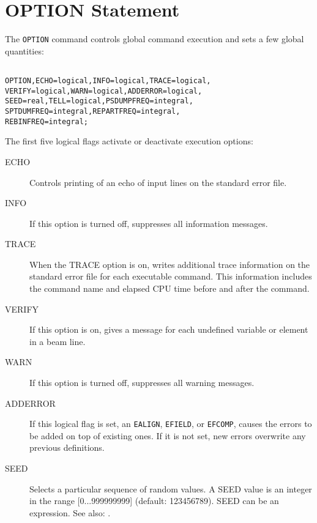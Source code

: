 \section{OPTION Statement}
\label{sec:option}
The \texttt{OPTION} command controls global command execution and sets
a few global quantities:
\begin{verbatim}

OPTION,ECHO=logical,INFO=logical,TRACE=logical,
VERIFY=logical,WARN=logical,ADDERROR=logical,
SEED=real,TELL=logical,PSDUMPFREQ=integral,
SPTDUMFREQ=integral,REPARTFREQ=integral,
REBINFREQ=integral;
\end{verbatim}
The first five logical flags activate or deactivate execution options:
\begin{description}
\item[ECHO]
  Controls printing of an echo of input lines on the standard error file.
\item[INFO]
  If this option is turned off, \opal suppresses all information messages. 
\item[TRACE]
  When the TRACE option is on,
  \opal writes additional trace information on the standard error file 
  for each executable command. 
  This information includes the command name
  and elapsed CPU time before and after the command.
\item[VERIFY]
  If this option is on, \opal gives a message for each undefined variable
  or element in a beam line.
\item[WARN]
  If this option is turned off, \opal suppresses all warning messages.
\item[ADDERROR]
  If this logical flag is set,
  an \texttt{EALIGN}, \texttt{EFIELD}, or \texttt{EFCOMP}, causes the errors to
  be added on top of existing ones.
  If it is not set, new errors overwrite any previous definitions.
\item[SEED]
  Selects a particular sequence of random values.
  A SEED value is an integer in the range [0...999999999] (default: 123456789).
  SEED can be an expression.
  See also: .

\end{description}
